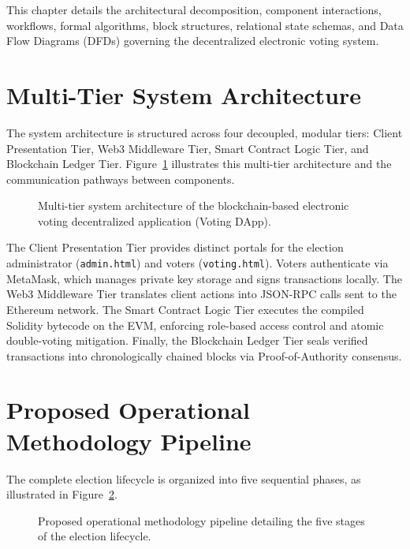 \documentclass[12pt,a4paper]{report}
\begin{document}
This chapter details the architectural decomposition, component interactions, workflows, formal algorithms, block structures, relational state schemas, and Data Flow Diagrams (DFDs) governing the decentralized electronic voting system.

\section{Multi-Tier System Architecture}
The system architecture is structured across four decoupled, modular tiers: Client Presentation Tier, Web3 Middleware Tier, Smart Contract Logic Tier, and Blockchain Ledger Tier. Figure~\ref{fig:sys_arch} illustrates this multi-tier architecture and the communication pathways between components.

\begin{figure}[H]
\centering
{}
\caption{Multi-tier system architecture of the blockchain-based electronic voting decentralized application (Voting DApp).}
\label{fig:sys_arch}
\end{figure}

The Client Presentation Tier provides distinct portals for the election administrator (\texttt{admin.html}) and voters (\texttt{voting.html}). Voters authenticate via MetaMask, which manages private key storage and signs transactions locally. The Web3 Middleware Tier translates client actions into JSON-RPC calls sent to the Ethereum network. The Smart Contract Logic Tier executes the compiled Solidity bytecode on the EVM, enforcing role-based access control and atomic double-voting mitigation. Finally, the Blockchain Ledger Tier seals verified transactions into chronologically chained blocks via Proof-of-Authority consensus.

\clearpage
\section{Proposed Operational Methodology Pipeline}
The complete election lifecycle is organized into five sequential phases, as illustrated in Figure~\ref{fig:methods_pipeline}.

\begin{figure}[H]
\centering
{}
\caption{Proposed operational methodology pipeline detailing the five stages of the election lifecycle.}
\label{fig:methods_pipeline}
\end{figure}
\end{document}
